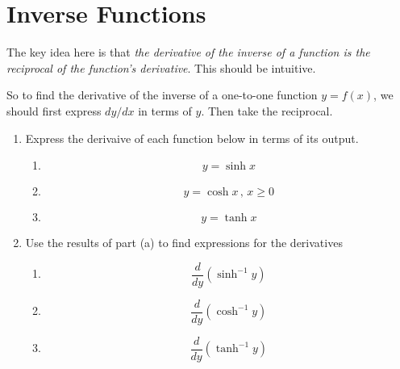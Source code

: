 \documentclass{ximera}
\begin{document}
\section{Inverse Functions}
The key idea here is that \emph{the derivative of the inverse of a function is the reciprocal of the function's derivative}. This should be intuitive.

So to find the derivative of the inverse of a one-to-one function $y=f(x)$, we should first express $dy/dx$ in terms of $y$. Then take the reciprocal.


\begin{enumerate}
\item Express the derivaive of each function below in terms of its output.
\begin{enumerate}
\item
\[
   y = \sinh x 
\]

\item
\[
   y = \cosh x \, , \, x\geq 0
\]

\item 
\[
    y = \tanh x 
\]
\end{enumerate}

\item Use the results of part (a) to find expressions for the derivatives
\begin{enumerate}
\item 
\[
    \frac{d}{dy} (\sinh^{-1} y)
\]

\item 
\[
    \frac{d}{dy} (\cosh^{-1} y)
\]

\item 
\[
    \frac{d}{dy} (\tanh^{-1} y)
\]

\end{enumerate}

\end{enumerate}
\end{document}
